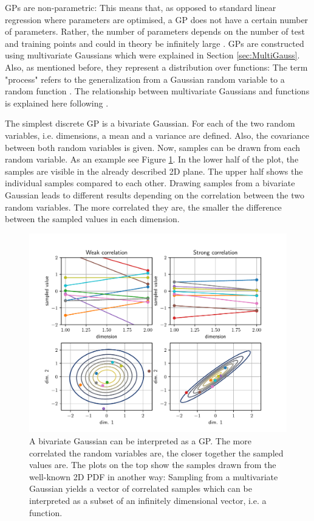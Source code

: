 \documentclass[%
  a4paper,oneside,%
  11pt,%
  smallchapters,
  style=printdev,
  extramargin,
  green,%
  rgb, <cmyk>
  ]{tubsbook}
\begin{document}
GPs are non-parametric: This means that, as opposed to standard linear regression where parameters are optimised, a GP does not have a certain number of parameters. Rather, the number of parameters depends on the number of test and training points and could in theory be infinitely large \cite{murphy2012} . 
GPs are constructed using multivariate Gaussians which were explained in Section \ref{sec:MultiGauss}. Also, as mentioned before, they represent a distribution over functions: The term "process" refers to the generalization from a Gaussian random variable to a random function \cite[p.13]{rasmussen2006}. The relationship between multivariate Gaussians and functions is explained here following \cite{damianou2021}.

The simplest discrete GP is a bivariate Gaussian. For each of the two random variables, i.e. dimensions, a mean and a variance are defined. Also, the covariance between both random variables is given. Now, samples can be drawn from each random variable. As an example see Figure \ref{fig:bivarGP}. In the lower half of the plot, the samples are visible in the already described 2D plane. The upper half shows the individual samples compared to each other. Drawing samples from a bivariate Gaussian leads to different results depending on the correlation between the two random variables. The more correlated they are, the smaller the difference between the sampled values in each dimension.
%
\begin{figure}[!ht]
\begin{center}
\includegraphics[width=1\textwidth]{pics/bivarGP}
\caption[Visual explanation of the intuition behind GPs 1]{A bivariate Gaussian can be interpreted as a GP. The more correlated the random variables are, the closer together the sampled values are. The plots on the top show the samples drawn from the well-known 2D PDF in another way: Sampling from a multivariate Gaussian yields a vector of correlated samples which can be interpreted as a subset of an infinitely dimensional vector, i.e. a function.}
\label{fig:bivarGP}
\end{center}
\end{figure}
\end{document}

